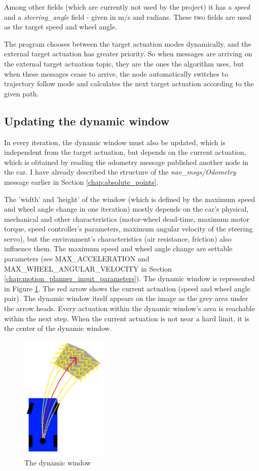 Among other fields (which are currently not used by the project) it has a \textit{speed} and a \textit{steering\_angle} field - given in m/s and radians. These two fields are used as the target speed and wheel angle.

The program chooses between the target actuation modes dynamically, and the external target actuation has greater priority. So when messages are arriving on the external target actuation topic, they are the ones the algorithm uses, but when these messages cease to arrive, the node automatically switches to trajectory follow mode and calculates the next target actuation according to the given path.

\subsection{Updating the dynamic window}
In every iteration, the dynamic window must also be updated, which is independent from the target actuation, but depends on the current actuation, which is obtained by reading the odometry message published another node in the car. I have already described the structure of the \textit{nav\_msgs/Odometry} \cite{ros_msg_Odometry} message earlier in Section \ref{chap:absolute_points}.

The 'width' and 'height' of the window (which is defined by the maximum speed and wheel angle change in one iteration) mostly depends on the car's physical, mechanical and other characteristics (motor-wheel dead-time, maximum motor torque, speed controller's parameters, maximum angular velocity of the steering servo), but the environment's characteristics (air resistance, friction) also influence them. The maximum speed and wheel angle change are settable parameters (see MAX\_ACCELERATION and MAX\_WHEEL\_ANGULAR\_VELOCITY in Section \ref{chap:motion_planner_input_parameters}). The dynamic window is represented in Figure \ref{dynamic_window}. The red arrow shows the current actuation (speed and wheel angle pair). The dynamic window itself appears on the image as the grey area under the arrow heads. Every actuation within the dynamic window's area is reachable within the next step. When the current actuation is not near a hard limit, it is the center of the dynamic window.

\begin{figure}[!ht]
    \centering
    \includegraphics[height=60mm]{figures/raw/dynamic_window.png}
    \caption{The dynamic window}
    \label{dynamic_window}
\end{figure}

